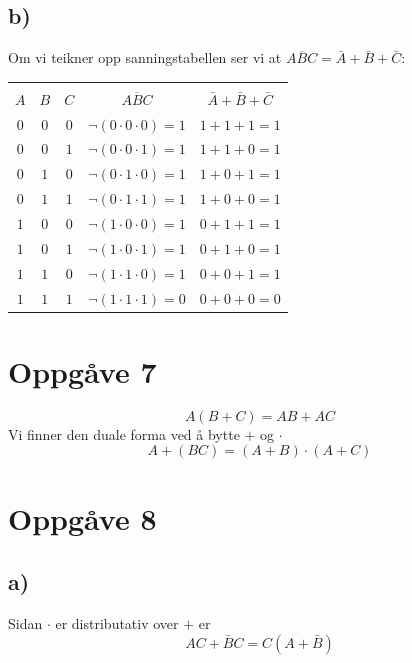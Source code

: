 \documentclass[12pt,a4paper]{article}
\begin{document}
		\subsection{b)}
		Om vi teikner opp sanningstabellen ser vi at $\overline{ABC}=\bar{A}+\bar{B}+\bar{C}$:
		\begin{center}
			\begin{tabular}{ |c|c|c|c|c| }
				\hline
				&&&& \\
				$A$	&	$B$	&	$C$	&	$\overline{ABC}$	&	$\bar{A}+\bar{B}+\bar{C}$ \\
				\hline
				$0$	&	$0$	&	$0$	&	$\neg(0\cdot0\cdot0)=1$	&	$1+1+1=1$ \\
				\hline
				$0$	&	$0$	&	$1$	&	$\neg(0\cdot0\cdot1)=1$	&	$1+1+0=1$ \\
				\hline
				$0$	&	$1$	&	$0$	&	$\neg(0\cdot1\cdot0)=1$	&	$1+0+1=1$ \\
				\hline
				$0$	&	$1$	&	$1$	&	$\neg(0\cdot1\cdot1)=1$	&	$1+0+0=1$ \\
				\hline
				$1$	&	$0$	&	$0$	&	$\neg(1\cdot0\cdot0)=1$	&	$0+1+1=1$ \\
				\hline
				$1$	&	$0$	&	$1$	&	$\neg(1\cdot0\cdot1)=1$	&	$0+1+0=1$ \\
				\hline
				$1$	&	$1$	&	$0$	&	$\neg(1\cdot1\cdot0)=1$	&	$0+0+1=1$ \\
				\hline
				$1$	&	$1$	&	$1$	&	$\neg(1\cdot1\cdot1)=0$	&	$0+0+0=0$ \\
				\hline
			\end{tabular}
		\end{center}

	\section{Oppgåve 7}
		\begin{equation}
			A(B+C)=AB+AC
		\end{equation}
		Vi finner den duale forma ved å bytte $+$ og $\cdot$
		\begin{equation}
			A+(BC)=(A+B)\cdot(A+C)
		\end{equation}
	
	\section{Oppgåve 8}
		\subsection{a)}
		Sidan $\cdot$ er distributativ over $+$ er
		\begin{equation}
			AC+\bar{B}C=C(A+\bar{B})
		\end{equation}
\end{document}
